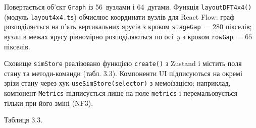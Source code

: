 \documentclass[
]{article}
\begin{document}
Повертається об'єкт \texttt{Graph} із 56~вузлами і 64~дугами. Функція
\texttt{layoutDFT4x4()} (модуль \texttt{layout4x4.ts}) обчислює
координати вузлів для React Flow: граф розподіляється на п'ять
вертикальних ярусів з кроком \texttt{stageGap} \(= 280\) пікселів; вузли
в межах ярусу рівномірно розподіляються по осі~\(y\) з кроком
\texttt{rowGap} \(= 65\) пікселів.

Сховище \texttt{simStore} реалізовано функцією
\texttt{create}\texttt{()} з Zustand і містить поля стану та
методи-команди (табл. 3.3). Компоненти UI підписуються на окремі зрізи
стану через хук
\texttt{useSimStore}\texttt{(}\texttt{selector}\texttt{)} з мемоїзацією:
наприклад, компонент \texttt{Metrics} підписується лише на поле
\texttt{metrics} і перемальовується тільки при його зміні (NF3).

Таблиця 3.3.
\end{document}
